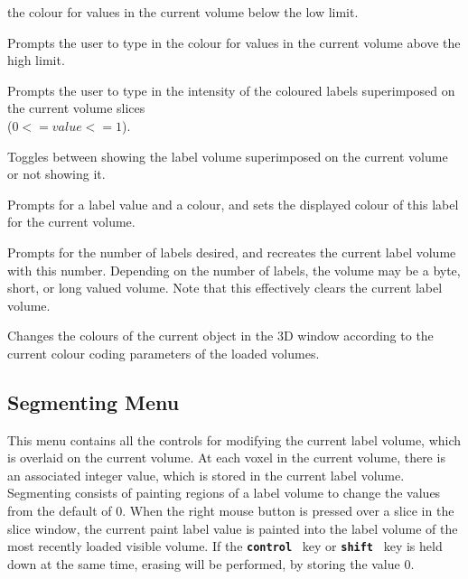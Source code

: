 \documentclass{article}
\newcommand{\ident}[1]{{\bf\tt #1}\ }
\newcommand{\menutwo}[2]{{\scriptsize \fbox{\bf #1}/\fbox{\bf #2}}}
\begin{document}
\begin{description}
               the colour for values in the current volume below the low limit.
\item[\menutwo{Colour Coding}{Over Colour}]  Prompts the user to type in
               the colour for values in the current volume above the high limit.
\item[\menutwo{Colour Coding}{Label Ratio}]  Prompts the user to type in the
                      intensity of the coloured labels superimposed on the 
                      current volume slices \\
                      ($0 <= value <= 1$).
\item[\menutwo{Colour Coding}{Show Labels}]  Toggles between showing
                      the label volume superimposed on the current
                      volume or not showing it.
\item[\menutwo{Colour Coding}{Set Paint Lbl Colr}]  Prompts for a
                      label value and a colour, and sets the displayed
                      colour of this label for the current volume.
\item[\menutwo{Colour Coding}{Num Labels}]  Prompts for the number
                      of labels desired, and recreates the current label volume
                      with this number.  Depending on the number of labels,
                      the volume may be a byte, short, or long valued volume.
                      Note that this effectively clears the current
                      label volume.
\item[\menutwo{Colour Coding}{Colour Code Object}]  Changes the
     colours of the current object in the 3D window according to the current
     colour coding parameters of the loaded volumes.
\end{description}

\subsection{Segmenting Menu}

This menu contains all the controls for modifying the current label volume,
which is overlaid on the current volume.  At each voxel in the current
volume, there is an associated integer value, which is
stored in the current label volume.  Segmenting consists of painting regions
of a label volume to change the values from the default of 0.
When the right mouse button is pressed over a slice in the slice
window, the current paint label value is painted into the label volume of the
most recently loaded visible volume.  If the \ident{control} key or
\ident{shift} key is held down
at the same time, erasing will be performed, by storing the value 0.
\end{document}
